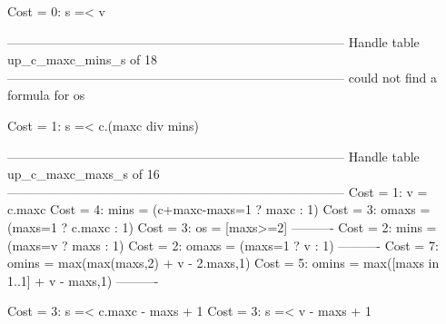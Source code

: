 Cost =  0:  s =< v

--------------------------------------------------------------------------------
Handle table up_c_maxc_mins_s of 18
--------------------------------------------------------------------------------
could not find a formula for os

Cost =  1:  s =< c.(maxc div mins)

--------------------------------------------------------------------------------
Handle table up_c_maxc_maxs_s of 16
--------------------------------------------------------------------------------
Cost =  1:  v     = c.maxc
Cost =  4:  mins  = (c+maxc-maxs=1 ? maxc : 1)
Cost =  3:  omaxs = (maxs=1 ? c.maxc : 1)
Cost =  3:  os    = [maxs>=2]
----------
Cost =  2:  mins  = (maxs=v ? maxs : 1)
Cost =  2:  omaxs = (maxs=1 ? v : 1)
----------
Cost =  7:  omins = max(max(maxs,2) + v - 2.maxs,1)
Cost =  5:  omins = max([maxs in 1..1] + v - maxs,1)
----------

Cost =  3:  s =< c.maxc - maxs + 1
Cost =  3:  s =< v - maxs + 1
